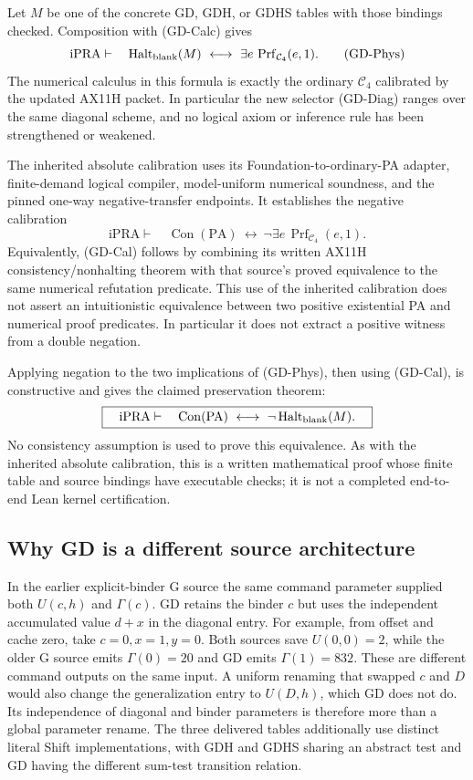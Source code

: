 Let $M$ be one of the concrete GD, GDH, or GDHS tables with those
bindings checked.  Composition with (GD-Calc) gives
\[
 \mathrm{iPRA}\vdash\quad
 \operatorname{Halt}_{\rm blank}(M)\ \longleftrightarrow\
           \exists e\,\operatorname{Prf}_{\mathcal C_4}(e,1).
                                                        \tag{GD-Phys}\label{eq:gd-phys}
\]
The numerical calculus in this formula is exactly the ordinary
$\mathcal C_4$ calibrated by the updated AX11H packet.  In particular
the new selector (GD-Diag) ranges over the same diagonal scheme, and no
logical axiom or inference rule has been strengthened or weakened.

The inherited absolute calibration uses its Foundation-to-ordinary-PA
adapter, finite-demand logical compiler, model-uniform numerical
soundness, and the pinned one-way negative-transfer endpoints.  It
establishes the negative calibration
\[
 \mathrm{iPRA}\vdash\quad
 \operatorname{Con}(\mathrm{PA})\ \longleftrightarrow\
       \neg\exists e\,\operatorname{Prf}_{\mathcal C_4}(e,1).
                                                        \tag{GD-Cal}\label{eq:gd-cal}
\]
Equivalently, (GD-Cal) follows by combining its written AX11H
consistency/nonhalting theorem with that source's proved equivalence to
the same numerical refutation predicate.  This use of the inherited
calibration does not assert an intuitionistic equivalence between two
positive existential PA and numerical proof predicates.  In particular
it does not extract a positive witness from a double negation.

Applying negation to the two implications of (GD-Phys), then using
(GD-Cal), is constructive and gives the claimed preservation theorem:
\[
 \boxed{\quad\mathrm{iPRA}\vdash\quad
   \operatorname{Con}(\mathrm{PA})\ \longleftrightarrow\
                 \neg\operatorname{Halt}_{\rm blank}(M).\quad}
\]
No consistency assumption is used to prove this equivalence.  As with
the inherited absolute calibration, this is a written mathematical
proof whose finite table and source bindings have executable checks;
it is not a completed end-to-end Lean kernel certification.

\subsection{Why GD is a different source architecture}

In the earlier explicit-binder G source the same command parameter
supplied both $U(c,h)$ and $\Gamma(c)$.  GD retains the binder $c$ but
uses the independent accumulated value $d+x$ in the diagonal entry.
For example, from offset and cache zero, take $c=0,x=1,y=0$.
Both sources save $U(0,0)=2$, while the older G source emits
$\Gamma(0)=20$ and GD emits $\Gamma(1)=832$.
These are different command outputs on the same input.  A uniform
renaming that swapped $c$ and $D$ would also change the generalization
entry to $U(D,h)$, which GD does not do.  Its independence of diagonal
and binder parameters is therefore more than a global parameter rename.
The three delivered tables additionally use distinct literal Shift
implementations, with GDH and GDHS sharing an abstract test and GD
having the different sum-test transition relation.
